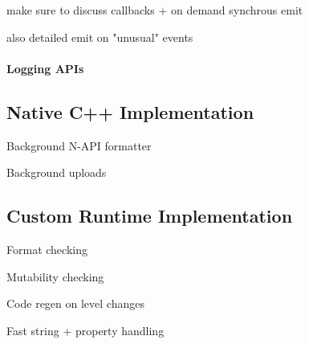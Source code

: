 make sure to discuss callbacks + on demand synchrous emit

also detailed emit on "unusual" events

\paragraph{Logging APIs}
\noindent

\subsection{Native C++ Implementation}

Background N-API formatter

Background uploads

\subsection{Custom Runtime Implementation}

Format checking

Mutability checking

Code regen on level changes

Fast string + property handling

